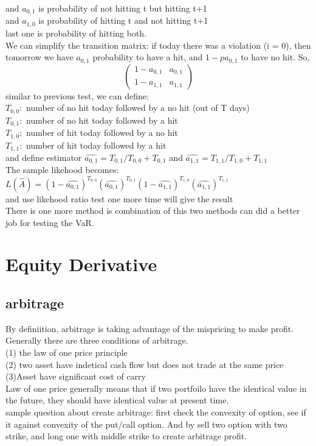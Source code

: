 \documentclass[a4paper,11pt]{article}
\begin{document}
and $a_{0,1}$ is probability of not hitting t but hitting t+1\\
and $a_{1,0}$ is probability of hitting t and not hitting t+1\\
last one is probability of hitting both.\\
We can simplify the transition matrix: if today there was a violation (i = 0), then tomorrow
we have $a_{0,1}$ probability to have a hit, and  $1-pa_{0,1}$  to have no hit. So,
$$
\begin{pmatrix}
1-a_{0,1} & a_{0,1} \\
1-a_{1,1} & a_{1,1}
\end{pmatrix}
$$
similar to previous test, we can define:\\
$T_{0,0}:$ number of no hit today followed by a no hit (out of T days)\\
$T_{0,1}:$ number of no hit today followed by a hit\\
$T_{1,0}:$ number of hit today followed by a no hit\\
$T_{1,1}:$ number of hit today followed by a hit\\
and define estimator $\hat{a_{0,1}}=T_{0,1}/T_{0,0}+T_{0,1}$ and $\hat{a_{1,1}}=T_{1,1}/T_{1,0}+T_{1,1}$\\
The sample likehood becomes:$L(\hat{A})=(1-\hat{a_{0,1}})^{T_{0,0}}(\hat{a_{0,1}})^{T_{0,1}}(1-\hat{a_{1,1}})^{T_{1,0}}(\hat{a_{1,1}})^{T_{1,1}}$\\
and use likehood ratio test one more time will give the result\\
There is one more method is combination of this two methods can did a better job for testing the VaR.
\section{Equity Derivative}
\subsection{arbitrage}
By definiition, arbitrage is taking advantage of the mispricing to make profit. Generally there are three conditions of arbitrage.\\
(1) the law of one price principle\\
(2) two asset have indetical cash flow but does not trade at the same price\\
(3)Asset have significant cost of carry\\
Law of one price generally means that if two portfoilo have the identical value in the future, they should have identical value at present time.\\
sample question about create arbitrage: first check the convexity of option, see if it against convexity of the put/call option. And by sell two option with two strike, and long one with middle strike to create arbitrage profit. \\ 
\end{document}
